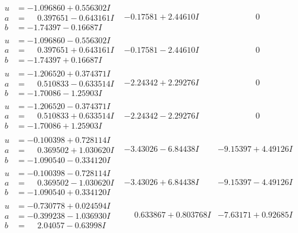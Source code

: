\documentclass[1p]{elsarticle_modified}
\theoremstyle{definition}
\begin{document}
$$\begin{array}{c|c|c}
\begin{aligned}
u &= -1.096860 + 0.556302 I \\
a &= \phantom{-}0.397651 - 0.643161 I \\
b &= -1.74397 - 0.16687 I\end{aligned}
 & -0.17581 + 2.44610 I & \phantom{-0.000000 } 0 \\ \hline\begin{aligned}
u &= -1.096860 - 0.556302 I \\
a &= \phantom{-}0.397651 + 0.643161 I \\
b &= -1.74397 + 0.16687 I\end{aligned}
 & -0.17581 - 2.44610 I & \phantom{-0.000000 } 0 \\ \hline\begin{aligned}
u &= -1.206520 + 0.374371 I \\
a &= \phantom{-}0.510833 - 0.633514 I \\
b &= -1.70086 - 1.25903 I\end{aligned}
 & -2.24342 + 2.29276 I & \phantom{-0.000000 } 0 \\ \hline\begin{aligned}
u &= -1.206520 - 0.374371 I \\
a &= \phantom{-}0.510833 + 0.633514 I \\
b &= -1.70086 + 1.25903 I\end{aligned}
 & -2.24342 - 2.29276 I & \phantom{-0.000000 } 0 \\ \hline\begin{aligned}
u &= -0.100398 + 0.728114 I \\
a &= \phantom{-}0.369502 + 1.030620 I \\
b &= -1.090540 - 0.334120 I\end{aligned}
 & -3.43026 - 6.84438 I & -9.15397 + 4.49126 I \\ \hline\begin{aligned}
u &= -0.100398 - 0.728114 I \\
a &= \phantom{-}0.369502 - 1.030620 I \\
b &= -1.090540 + 0.334120 I\end{aligned}
 & -3.43026 + 6.84438 I & -9.15397 - 4.49126 I \\ \hline\begin{aligned}
u &= -0.730778 + 0.024594 I \\
a &= -0.399238 - 1.036930 I \\
b &= \phantom{-}2.04057 - 0.63998 I\end{aligned}
 & \phantom{-}0.633867 + 0.803768 I & -7.63171 + 0.92685 I \\ \hline\begin{aligned}

\end{aligned}
\end{array}$$
\end{document}
